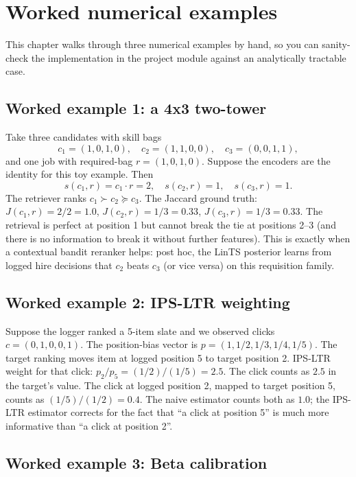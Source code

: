 \documentclass[11pt,oneside]{scrbook}
\begin{document}
\chapter{Worked numerical examples}

This chapter walks through three numerical examples by hand, so you can
sanity-check the implementation in the project module against an
analytically tractable case.

\section{Worked example 1: a 4x3 two-tower}

Take three candidates with skill bags
\[
c_1 = (1, 0, 1, 0),\quad c_2 = (1, 1, 0, 0),\quad c_3 = (0, 0, 1, 1),
\]
and one job with required-bag $r = (1, 0, 1, 0)$. Suppose the encoders are
the identity for this toy example. Then
\[
s(c_1, r) = c_1 \cdot r = 2, \quad s(c_2, r) = 1, \quad s(c_3, r) = 1.
\]
The retriever ranks $c_1 \succ c_2 \succeq c_3$. The Jaccard ground truth:
$J(c_1, r) = 2/2 = 1.0$, $J(c_2, r) = 1/3 = 0.33$, $J(c_3, r) = 1/3 = 0.33$.
The retrieval is perfect at position 1 but cannot break the tie at
positions 2--3 (and there is no information to break it without further
features). This is exactly when a contextual bandit reranker helps:
post hoc, the LinTS posterior learns from logged hire decisions that $c_2$
beats $c_3$ (or vice versa) on this requisition family.

\section{Worked example 2: IPS-LTR weighting}

Suppose the logger ranked a 5-item slate and we observed clicks
$c = (0, 1, 0, 0, 1)$. The position-bias vector is $p = (1, 1/2, 1/3, 1/4, 1/5)$.
The target ranking moves item at logged position 5 to target position 2.
IPS-LTR weight for that click: $p_2 / p_5 = (1/2)/(1/5) = 2.5$. The click
counts as $2.5$ in the target's value. The click at logged position 2,
mapped to target position 5, counts as $(1/5)/(1/2) = 0.4$. The naive
estimator counts both as $1.0$; the IPS-LTR estimator corrects for the
fact that ``a click at position 5'' is much more informative than
``a click at position 2''.

\section{Worked example 3: Beta calibration}
\end{document}
